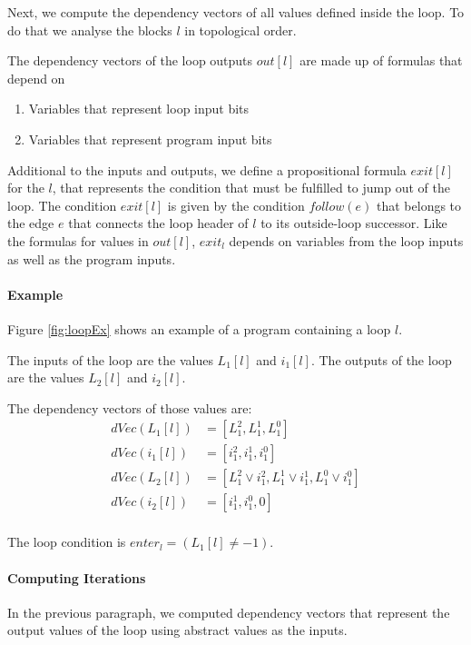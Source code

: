 Next, we compute the dependency vectors of all values defined inside the loop. To do that we analyse the blocks $l$ in topological order.

The dependency vectors of the loop outputs $out[l]$ are made up of formulas that depend on
\begin{enumerate}
    \setlength\itemsep{0em}
    \item Variables that represent loop input bits
    \item Variables that represent program input bits
\end{enumerate}

Additional to the inputs and outputs, we define a propositional formula $exit[l]$ for the $l$, that represents the condition that must be fulfilled to jump out of the loop. The  condition $exit[l]$ is given by the condition $follow(e)$ that belongs to the edge $e$ that connects the loop header of $l$ to its outside-loop successor. Like the formulas for values in $out[l]$, $exit_l$ depends on variables from the loop inputs as well as the program inputs. 

\paragraph{Example}
Figure \ref{fig:loopEx} shows an example of a program containing a loop $l$.

The inputs of the loop are the values $L_1[l]$ and $i_1[l]$. The outputs of the loop are the values $L_2[l]$ and $i_2[l]$.

The dependency vectors of those values are:
\begin{align*}
    dVec(L_1[l]) &= [L_1^2, L_1^1, L_1^0] \\
    dVec(i_1[l]) &= [i_1^2, i_1^1, i_1^0] \\
    dVec(L_2[l]) &= [L_1^2 \lor i_1^2, L_1^1 \lor i_1^1, L_1^0 \lor i_1^0] \\
    dVec(i_2[l]) &= [i_1^1, i_1^0, 0] \\
\end{align*}

The loop condition is $enter_l = (L_1[l] \neq -1)$.

\paragraph{Computing Iterations}
In the previous paragraph, we computed dependency vectors that represent the output values of the loop using abstract values as the inputs.

